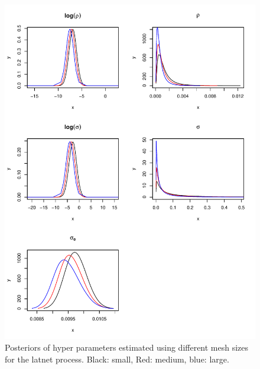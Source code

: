 \documentclass[a4paper,12pt]{article}
\begin{document}
\begin{figure}[htbp]
 \begin{center}
 \includegraphics[scale = 0.8]{fig/MeshSize_1hyperpar.pdf}
 \end{center}
 \caption[Hyper parameter for different mesh sizes]{Posteriors of hyper parameters estimated using different mesh sizes for the latnet process. Black: small, Red: medium, blue: large.}
 \label{fig:2}
 \end{figure}
\end{document}
